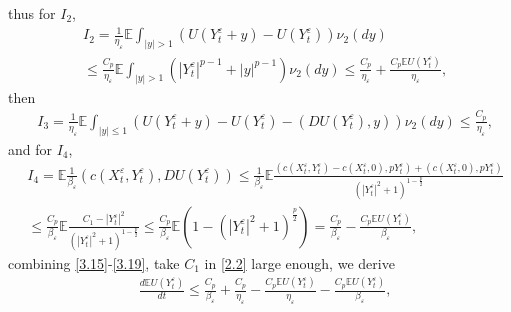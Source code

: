 \documentclass[11pt,reqno]{amsart}
\numberwithin{equation}{section}
\begin{document}
	thus for $I_{2}$,
	\begin{equation}\label{3.17}
		\begin{split}
			&I_{2}=\frac{1}{\eta_{\varepsilon}}\mathbb{E} \int_{|y|> 1}\left( U(Y_{t}^{\varepsilon}+y)-U(Y_{t}^{\varepsilon}) \right) \nu_{2}(dy) \\
			&\leq  \frac{C_{p}}{\eta_{\varepsilon}}\mathbb{E}\int_{|y|> 1}\left(|Y_{t}^{\varepsilon}|^{p-1}+|y|^{p-1} \right) \nu_{2}(dy) \leq\frac{C_{p}}{\eta_{\varepsilon}}+\frac{C_{p}\mathbb{E}U(Y_{t}^{\varepsilon})}{\eta_{\varepsilon}},  
		\end{split}
	\end{equation}
	then 
	\begin{equation}\label{3.18}
		\begin{split}
			&I_{3}=\frac{1}{\eta_{\varepsilon}}\mathbb{E} \int_{|y|\leq 1}\left( U(Y_{t}^{\varepsilon}+y)-U(Y_{t}^{\varepsilon})-( DU(Y_{t}^{\varepsilon}),y) \right) \nu_{2}(dy)\leq  \frac{C_{p}}{\eta_{\varepsilon}},  
		\end{split}
	\end{equation}
	and for $I_{4}$,
	\begin{equation}\label{3.19}
		\begin{split}
			&I_{4}=\mathbb{E} \frac{1}{\beta_{\varepsilon}}( c(X_{t}^{\varepsilon},Y_{t}^{\varepsilon}),DU(Y_{t}^{\varepsilon})) \leq \frac{1}{\beta_{\varepsilon}} \mathbb{E} \frac{( c(X_{t}^{\varepsilon},Y_{t}^{\varepsilon})-c(X_{t}^{\varepsilon},0),pY_{t}^{\varepsilon}) +( c(X_{t}^{\varepsilon},0),pY_{t}^{\varepsilon})}{(|Y_{t}^{\varepsilon}|^{2}+1)^{1-\frac{p}{2}}}\\
			&\leq  \frac{C_{p}}{\beta_{\varepsilon}}\mathbb{E} \frac{C_{1}-|Y_{t}^{\varepsilon}|^{2}}{(|Y_{t}^{\varepsilon}|^{2}+1)^{1-\frac{p}{2}}}\leq \frac{C_{p}}{\beta_{\varepsilon}}\mathbb{E}\left( 1-(|Y_{t}^{\varepsilon}|^{2}+1)^{\frac{p}{2}}\right)=\frac{C_{p}}{\beta_{\varepsilon}}-\frac{C_{p}\mathbb{E}U(Y_{t}^{\varepsilon})}{\beta_{\varepsilon}},  
		\end{split}
	\end{equation}
	combining \eqref{3.15}-\eqref{3.19}, take $C_{1}$ in \eqref{2.2} large enough, we derive
	\begin{equation}\label{3.20}
		\begin{split}
			&\frac{d\mathbb{E}U(Y_{t}^{\varepsilon})}{dt}\leq\frac{C_{p}}{\beta_{\varepsilon}}+\frac{C_{p}}{\eta_{\varepsilon}}-\frac{C_{p}\mathbb{E}U(Y_{t}^{\varepsilon})}{\eta_{\varepsilon}}-\frac{C_{p}\mathbb{E}U(Y_{t}^{\varepsilon})}{\beta_{\varepsilon}},\nonumber
		\end{split}
	\end{equation}
\end{document}
